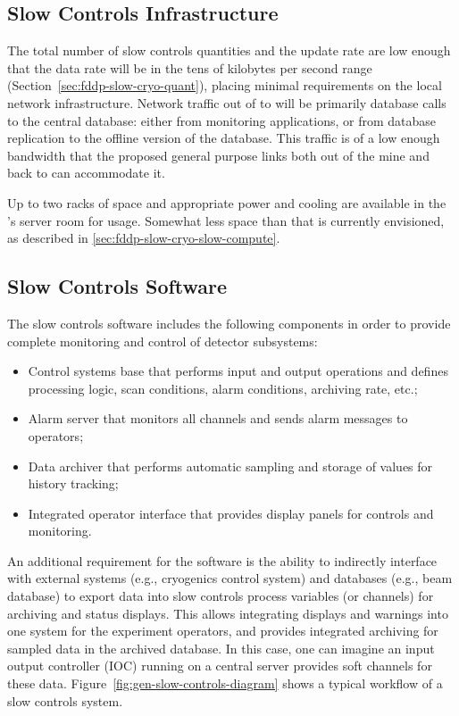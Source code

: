 \subsection{Slow Controls Infrastructure}
\label{sec:fddp-slow-cryo-slow-infra}

The total number of slow controls quantities and the update rate are low enough
that the data rate will be in the tens of kilobytes per second range
(Section~\ref{sec:fddp-slow-cryo-quant}), placing minimal requirements
on the local network infrastructure.
Network traffic out of \surf to \fnal will be primarily database calls
to the central  database: either from monitoring applications, or from
database replication to the offline version of the  database.  This
traffic is of a low enough bandwidth that the proposed general purpose
links both out of the mine and back to \fnal can accommodate it.

Up to two racks of space and appropriate power and cooling are
available in the 's  server room for  usage.
Somewhat less space than that is currently envisioned, as described in
\ref{sec:fddp-slow-cryo-slow-compute}.

\subsection{Slow Controls Software}
\label{sec:fddp-slow-cryo-sw}


The slow controls software includes the following components in order 
to provide complete monitoring and control of detector subsystems:
%
\begin{itemize}
 \item{Control systems base} that performs input and output operations
  and defines processing logic, scan conditions, alarm conditions,
  archiving rate, etc.;
 \item{Alarm server} that monitors all channels and sends alarm
  messages to operators; 
 \item{Data archiver} that performs automatic sampling and storage of
  values for history tracking;
 \item{Integrated operator interface} that provides display panels for
  controls and monitoring.
\end{itemize}

An additional requirement for the software is the ability to indirectly
interface with external systems (e.g., cryogenics control
system) and databases (e.g., beam database) to export data into
slow controls process variables (or channels) for archiving and status
displays. This allows integrating displays and warnings into one
system for the experiment operators, and %
provides integrated
archiving for sampled data in the archived database. In this case, one
can imagine an input output controller (IOC) running on a central 
server provides soft channels for these data.
Figure~\ref{fig:gen-slow-controls-diagram} shows a typical workflow of a
slow controls system.

